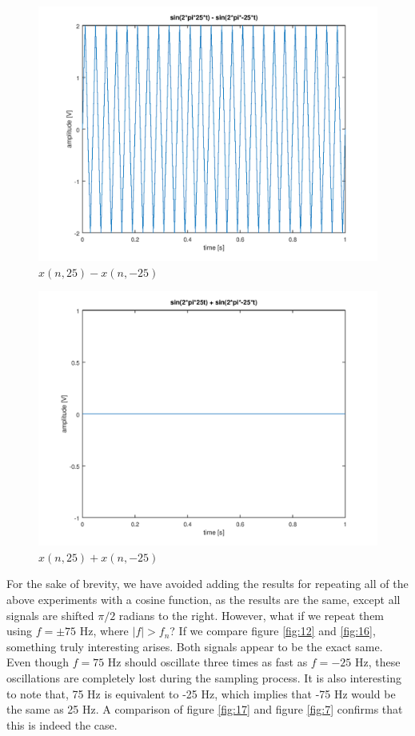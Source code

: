 \documentclass[a4paper, 12pt]{report}
\begin{document}
			\begin{figure}[H]
				\includegraphics[width=\textwidth]{img/1_14_diff.png}
				\caption{$x(n, 25) - x(n, -25)$}
				\label{fig:14}
			\end{figure}

			\begin{figure}[H]
				\includegraphics[width=\textwidth]{img/1_15_cancel.png}
				\caption{$x(n, 25) + x(n, -25)$}
				\label{fig:15}
			\end{figure}

			For the sake of brevity, we have avoided adding the results for repeating all of the above experiments with a cosine function, as the results are the same, except all signals are shifted $\pi/2$ radians to the right. However, what if we repeat them using $f=\pm75$ Hz, where $|f| > f_n$? If we compare figure \ref{fig:12} and \ref{fig:16}, something truly interesting arises. Both signals appear to be the exact same. Even though $f=75$ Hz should oscillate three times as fast as $f=-25$ Hz, these oscillations are completely lost during the sampling process. It is also interesting to note that, 75 Hz is equivalent to -25 Hz, which implies that -75 Hz would be the same as 25 Hz. A comparison of figure \ref{fig:17} and figure \ref{fig:7} confirms that this is indeed the case.
\end{document}
